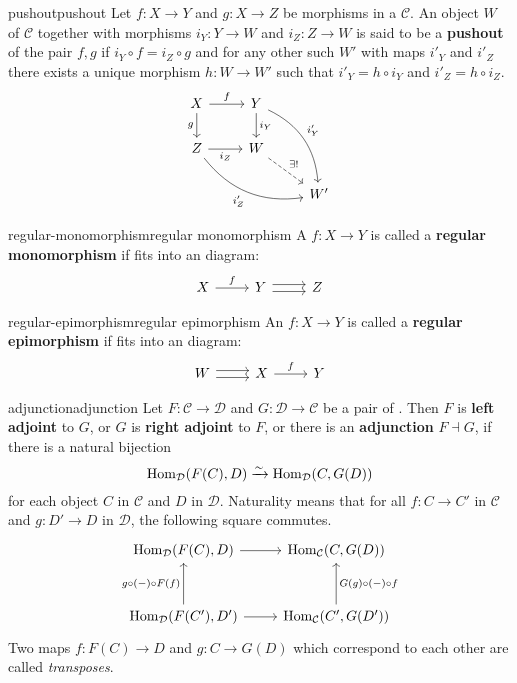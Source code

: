 \begin{topic}{pushout}{pushout}
    Let $f : X \to Y$ and $g : X \to Z$ be morphisms in a  $\mathcal{C}$. An object $W$ of $\mathcal{C}$ together with morphisms $i_Y: Y \to W$ and $i_Z : Z \to W$ is said to be a \textbf{pushout} of the pair $f, g$ if $i_Y \circ f = i_Z \circ g$ and for any other such $W'$ with maps $i'_Y$ and $i'_Z$ there exists a unique morphism $h : W \to W'$ such that $i'_Y = h \circ i_Y$ and $i'_Z = h \circ i_Z$.
    \[ \begin{tikzcd} X \arrow{r}{f} \arrow[swap]{d}{g} & Y \arrow{d}{i_Y} \arrow[bend left=30]{rdd}{i'_Y} & \\ Z \arrow[swap]{r}{i_Z} \arrow[swap, bend right=30]{drr}{i'_Z} & W \arrow[dashed]{rd}{\exists!} & \\ & & W' \end{tikzcd} \]
\end{topic}

\begin{topic}{regular-monomorphism}{regular monomorphism}
    A  $f : X \to Y$ is called a \textbf{regular monomorphism} if fits into an  diagram:
    \[ \begin{tikzcd} X \arrow{r}{f} & Y \arrow[shift left=0.25em]{r} \arrow[shift right=0.25em]{r} & Z \end{tikzcd} \]
\end{topic}

\begin{topic}{regular-epimorphism}{regular epimorphism}
    An  $f : X \to Y$ is called a \textbf{regular epimorphism} if fits into an  diagram:
    \[ \begin{tikzcd} W \arrow[shift left=0.25em]{r} \arrow[shift right=0.25em]{r} & X \arrow{r}{f} & Y \end{tikzcd} \]
\end{topic}

\begin{topic}{adjunction}{adjunction}
    Let $F : \mathcal{C} \to \mathcal{D}$ and $G : \mathcal{D} \to \mathcal{C}$ be a pair of . Then $F$ is \textbf{left adjoint} to $G$, or $G$ is \textbf{right adjoint} to $F$, or there is an \textbf{adjunction} $F \dashv G$, if there is a natural bijection
    \[ \operatorname{Hom}_{\mathcal{D}}(F(C), D) \xrightarrow{\sim} \operatorname{Hom}_{\mathcal{D}}(C, G(D)) \]
    for each object $C$ in $\mathcal{C}$ and $D$ in $\mathcal{D}$. Naturality means that for all $f : C \to C'$ in $\mathcal{C}$ and $g : D' \to D$ in $\mathcal{D}$, the following square commutes.
    \[ \begin{tikzcd}[row sep=3em] \Hom_{\mathcal{D}}(F(C), D) \arrow{r} & \Hom_{\mathcal{C}}(C, G(D)) \\ \Hom_{\mathcal{D}}(F(C'), D') \arrow{r} \arrow{u}{g \circ (-) \circ F(f)} & \Hom_{\mathcal{C}}(C', G(D')) \arrow[swap]{u}{G(g) \circ (-) \circ f} \end{tikzcd} \]
    Two maps $f : F(C) \to D$ and $g : C \to G(D)$ which correspond to each other are called \textit{transposes}.
\end{topic}

